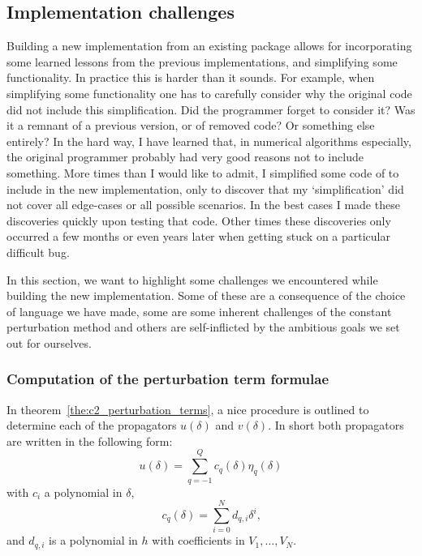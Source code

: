\subsection{Implementation challenges}\label{sec:c2_implementation_challenges}

Building a new implementation from an existing package allows for incorporating some learned lessons from the previous implementations, and simplifying some functionality.  In practice this is harder than it sounds. For example, when simplifying some functionality one has to carefully consider why the original code did not include this simplification. Did the programmer forget to consider it? Was it a remnant of a previous version, or of removed code? Or something else entirely? In the hard way, I have learned that, in numerical algorithms especially, the original programmer probably had very good reasons not to include something. More times than I would like to admit, I simplified some code of  to include in the new implementation, only to discover that my `simplification' did not cover all edge-cases or all possible scenarios. In the best cases I made these discoveries quickly upon testing that code. Other times these discoveries only occurred a few months or even years later when getting stuck on a particular difficult bug.

In this section, we want to highlight some challenges we encountered while building the new implementation. Some of these are a consequence of the choice of language we have made, some are some inherent challenges of the constant perturbation method and others are self-inflicted by the ambitious goals we set out for ourselves.

\subsubsection{Computation of the perturbation term formulae}

In theorem~\ref{the:c2_perturbation_terms}, a nice procedure is outlined to determine each of the propagators $u(\delta)$ and $v(\delta)$. In short both propagators are written in the following form:
$$
    u(\delta) = \sum_{q = -1}^{Q} c_q(\delta) \eta_{q}(\delta)
$$
with $c_i$ a polynomial in $\delta$,
\begin{equation}\label{equ:c2_symbolic_propagators}
    c_q(\delta)  = \sum_{i=0}^{N} d_{q, i} \delta^i\text{,}
\end{equation}
and $d_{q, i}$ is a polynomial in $h$ with coefficients in $V_1, \dots, V_{N}$.

